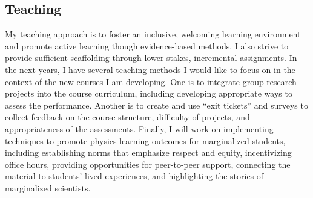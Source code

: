 \documentclass[11pt,letterpaper,notitlepage]{article}
\begin{document}
\vspace{-1ex}
\subsection*{Teaching}

My teaching approach is to foster an inclusive, welcoming learning environment and promote active learning though evidence-based methods.
I also strive to provide sufficient scaffolding through lower-stakes, incremental assignments.
In the next years, I have several teaching methods I would like to focus on in the context of the new courses I am developing.
One is to integrate group research projects into the course curriculum, including developing appropriate ways to assess the performance.
Another is to create and use ``exit tickets'' and surveys to collect feedback on the course structure, difficulty of projects, and appropriateness of the assessments.
Finally, I will work on implementing techniques to promote physics learning outcomes for marginalized students, including establishing norms that emphasize respect and equity, incentivizing office hours, providing opportunities for peer-to-peer support, connecting the material to students' lived experiences, and highlighting the stories of marginalized scientists.
\end{document}
